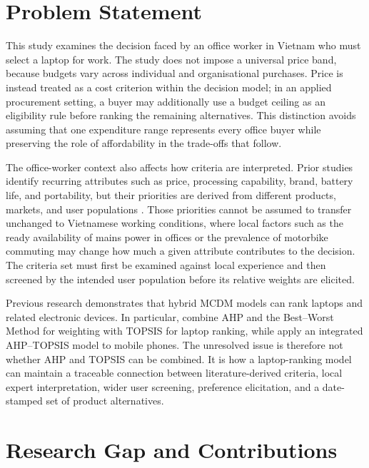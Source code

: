 \section{Problem Statement}\label{sec:problem}

This study examines the decision faced by an office worker in Vietnam who must select a laptop
for work. The study does not impose a universal price band, because budgets vary across individual
and organisational purchases. Price is instead treated as a cost criterion within the decision
model; in an applied procurement setting, a buyer may additionally use a budget ceiling as an
eligibility rule before ranking the remaining alternatives. This distinction avoids assuming that
one expenditure range represents every office buyer while preserving the role of affordability in
the trade-offs that follow.

The office-worker context also affects how criteria are interpreted. Prior studies
identify recurring attributes such as price, processing capability, brand, battery life, and
portability, but their priorities are derived from different products, markets, and user
populations \parencite{sonmez_cakir_determination_2020,liao_determinants_2022,weng_siew_lam_evaluation_2023}.
Those priorities cannot be assumed to transfer unchanged to Vietnamese working conditions, where
local factors such as the ready availability of mains power in offices or the prevalence of
motorbike commuting may change how much a given attribute contributes to the decision. The
criteria set must first be examined against local experience and then screened by the intended
user population before its relative weights are elicited.

Previous research demonstrates that hybrid MCDM models can rank laptops and related electronic
devices. In particular, \textcite{gaur_application_2023} combine AHP and the Best--Worst Method
for weighting with TOPSIS for laptop ranking, while \textcite{weng_siew_lam_evaluation_2023}
apply an integrated AHP--TOPSIS model to mobile phones. The unresolved issue is therefore not
whether AHP and TOPSIS can be combined. It is how a laptop-ranking model can maintain a traceable
connection between literature-derived criteria, local expert interpretation, wider user
screening, preference elicitation, and a date-stamped set of product alternatives.

\section{Research Gap and Contributions}\label{sec:gap-contrib}

